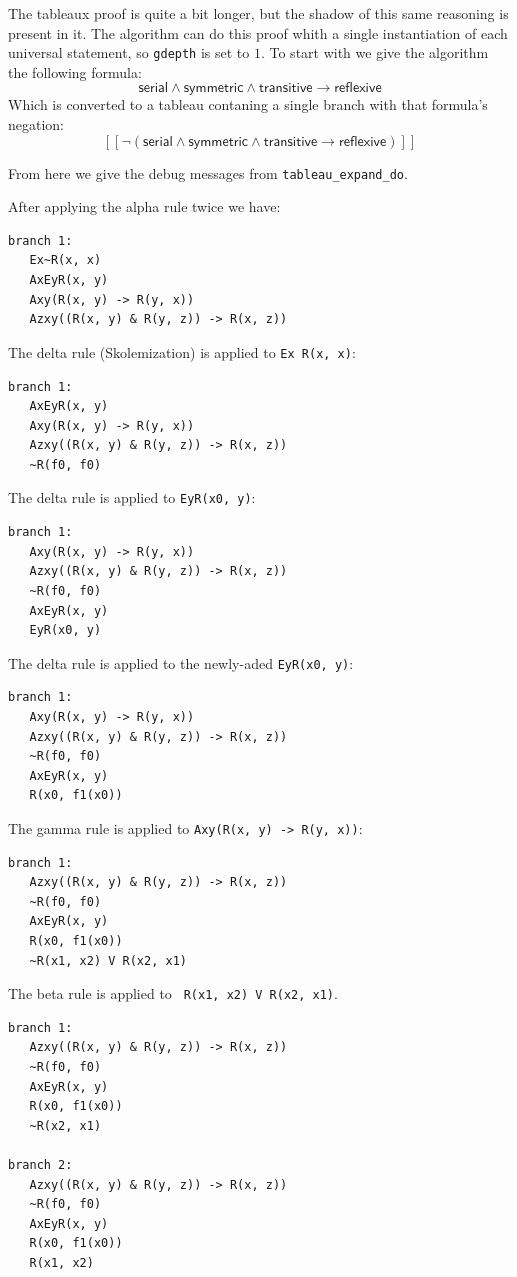 \documentclass[a4paper,notitlepage]{scrartcl}
\begin{document}
The tableaux proof is quite a bit longer, but the shadow of this same 
   reasoning is present in it.
The algorithm can do this proof whith a single instantiation of each 
   universal statement, so \texttt{gdepth} is set to $1$.
To start with we give the algorithm the following formula:
\[
\textsf{serial}\land\textsf{symmetric}\land\textsf{transitive}
   \rightarrow\textsf{reflexive}
\]
Which is converted to a tableau contaning a single branch with that 
   formula's negation:
\[
[[\lnot(\textsf{serial}\land\textsf{symmetric}\land\textsf{transitive}
   \rightarrow\textsf{reflexive})]]
\]

From here we give the debug messages from \texttt{tableau\_expand\_do}.

After applying the alpha rule twice we have:
\begin{verbatim}
branch 1:
   Ex~R(x, x)
   AxEyR(x, y)
   Axy(R(x, y) -> R(y, x))
   Azxy((R(x, y) & R(y, z)) -> R(x, z))
\end{verbatim}

The   delta rule (Skolemization) is applied to \texttt{Ex~R(x, x)}:
\begin{verbatim}
branch 1:
   AxEyR(x, y)
   Axy(R(x, y) -> R(y, x))
   Azxy((R(x, y) & R(y, z)) -> R(x, z))
   ~R(f0, f0)
\end{verbatim}

The delta rule is applied to \texttt{EyR(x0, y)}:
\begin{verbatim}
branch 1:
   Axy(R(x, y) -> R(y, x))
   Azxy((R(x, y) & R(y, z)) -> R(x, z))
   ~R(f0, f0)
   AxEyR(x, y)
   EyR(x0, y)
\end{verbatim}

The delta rule is applied to the newly-aded \texttt{EyR(x0, y)}:

\begin{verbatim}
branch 1:
   Axy(R(x, y) -> R(y, x))
   Azxy((R(x, y) & R(y, z)) -> R(x, z))
   ~R(f0, f0)
   AxEyR(x, y)
   R(x0, f1(x0))
\end{verbatim}

The gamma rule is applied to \texttt{Axy(R(x, y) -> R(y, x))}:
\begin{verbatim}
branch 1:
   Azxy((R(x, y) & R(y, z)) -> R(x, z))
   ~R(f0, f0)
   AxEyR(x, y)
   R(x0, f1(x0))
   ~R(x1, x2) V R(x2, x1)
\end{verbatim}

The beta rule is applied to \texttt{~R(x1, x2) V R(x2, x1)}.

\begin{verbatim}
branch 1:
   Azxy((R(x, y) & R(y, z)) -> R(x, z))
   ~R(f0, f0)
   AxEyR(x, y)
   R(x0, f1(x0))
   ~R(x2, x1)

branch 2:
   Azxy((R(x, y) & R(y, z)) -> R(x, z))
   ~R(f0, f0)
   AxEyR(x, y)
   R(x0, f1(x0))
   R(x1, x2)
\end{verbatim}
\end{document}
